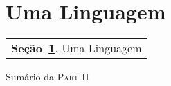 \section{Uma Linguagem} %
\label{sec:aprendendo}

\begin{margintable}\vspace{.8in}\footnotesize
  \begin{tabularx}{\marginparwidth}{|X}
    \textbf{\sffamily \textcolor{azulUFRB}{Seção}~\ref{sec:aprendendo}}.    {\sffamily Uma Linguagem} \\
  \end{tabularx}
  \caption{Sumário da \textsc{Part II}}
\end{margintable}